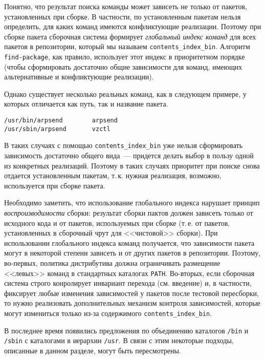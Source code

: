 \documentclass[russian,a4paper,12pt,titlepage]{article}
\begin{document}
Понятно, что результат поиска команды может зависеть не только от пакетов, установленных при сборке.  В частности,
по установленным пакетам нельзя определить, для каких команд имеются конфликтующие реализации.  Поэтому при сборке
пакета сборочная система формирует \textit{глобальный индекс команд} для всех пакетов в репозитории, который
мы называем \verb|contents_index_bin|.  Алгоритм \verb|find-package|, как правило, использует этот индекс в приоритетном
порядке (чтобы сформировать достаточно общие зависимости для команд, имеющих альтернативные и конфликтующие реализации).

Однако существует несколько реальных команд, как в следующем примере, у которых отличается как путь, так и название
пакета.
\begin{verbatim}
/usr/bin/arpsend        arpsend
/usr/sbin/arpsend       vzctl
\end{verbatim}
В таких случаях с помощью \verb|contents_index_bin| уже нельзя сформировать зависимость достаточно общего вида~---
придется делать выбор в пользу одной из конкретных реализаций.  Поэтому в таких случаях приоритет при поиске снова
отдается установленным пакетам, т.\,к. нужная реализация, возможно, используется при сборке пакета.

Необходимо заметить, что использование глобального индекса нарушает принцип \textit{воспроизводимости} сборки:
результат сборки пактов должен зависеть только от исходного кода и от пакетов, используемых при сборке (т.\,е. от пакетов,
установленных в сборочный чрут для <<чистовой>> сборки).  При использовании глобального индекса команд получается,
что зависимости пакета могут в некоторой степени зависеть и от других пакетов в репозитории.  Поэтому, во-первых,
политика дистрибутива должна ограничивать размещение <<левых>> команд в стандартных каталогах \verb|PATH|.  Во-вторых,
если сборочная система строго конролирует инвариант перехода (см. введение) и, в частности, фиксирует любые изменения
зависимостей у пакетов после тестовой пересборки, то нужно реализовать дополнительных механизм контроля зависимостей,
которые могут измениться только из-за содержимого \verb|contents_index_bin|.

В последнее время появились предложения по объединению каталогов \verb|/bin| и \verb|/sbin| с каталогами в иерархии \verb|/usr|.
В связи с этим некоторые подходы, описанные в данном разделе, могут быть пересмотрены.
\pagebreak
\end{document}
